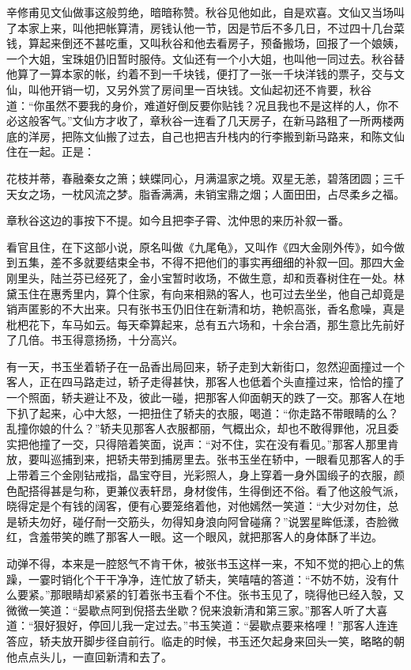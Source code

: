 \documentclass[12pt,UTF8]{ctexbook}
\begin{document}
{{{辛修甫见文仙做事这般剪绝，暗暗称赞。秋谷见他如此，自是欢喜。文仙又当场叫了本家上来，叫他把帐算清，房钱认他一节，因是节后不多几日，不过四十几台菜钱，算起来倒还不甚吃重，又叫秋谷和他去看房子，预备搬场，回报了一个娘姨，一个大姐，宝珠姐仍旧暂时服侍。文仙还有一个小大姐，也叫他一同过去。秋谷替他算了一算本家的帐，约着不到一千块钱，便打了一张一千块洋钱的票子，交与文仙，叫他开销一切，又另外赏了房间里一百块钱。文仙起初还不肯要，秋谷道：“你虽然不要我的身价，难道好倒反要你贴钱？况且我也不是这样的人，你不必这般客气。”文仙方才收了，章秋谷一连看了几天房子，在新马路租了一所两楼两底的洋房，把陈文仙搬了过去，自己也把吉升栈内的行李搬到新马路来，和陈文仙住在一起。正是：

花枝并蒂，春融秦女之箫；蛱蝶同心，月满温家之境。双星无恙，碧落团圆；三千天女之场，一枕风流之梦。脂香满满，未销宝鼎之烟；人面田田，占尽柔乡之福。

章秋谷这边的事按下不提。如今且把李子霄、沈仲思的来历补叙一番。

看官且住，在下这部小说，原名叫做《九尾龟》，又叫作《四大金刚外传》，如今做到五集，差不多就要结束全书，不得不把他们的事实再细细的补叙一回。那四大金刚里头，陆兰芬已经死了，金小宝暂时收场，不做生意，却和贡春树住在一处。林黛玉住在惠秀里内，算个住家，有向来相熟的客人，也可过去坐坐，他自己却竟是销声匿影的不大出来。只有张书玉仍旧住在新清和坊，艳帜高张，香名愈噪，真是枇杷花下，车马如云。每天牵算起来，总有五六场和，十余台酒，那生意比先前好了几倍。书玉得意扬扬，十分高兴。

有一天，书玉坐着轿子在一品香出局回来，轿子走到大新街口，忽然迎面撞过一个客人，正在四马路走过，轿子走得甚快，那客人也低着个头直撞过来，恰恰的撞了一个照面，轿夫避让不及，彼此一碰，把那客人仰面朝天的跌了一交。那客人在地下扒了起来，心中大怒，一把扭住了轿夫的衣服，喝道：“你走路不带眼睛的么？乱撞你娘的什么？”轿夫见那客人衣服都丽，气概出众，却也不敢得罪他，况且委实把他撞了一交，只得陪着笑面，说声：“对不住，实在没有看见。”那客人那里肯放，要叫巡捕到来，把轿夫带到捕房里去。张书玉坐在轿中，一眼看见那客人的手上带着三个金刚钻戒指，晶宝夺目，光彩照人，身上穿着一身外国缎子的衣服，颜色配搭得甚是匀称，更兼仪表轩昂，身材俊伟，生得倒还不俗。看了他这般气派，晓得定是个有钱的阔客，便有心要笼络着他，对他嫣然一笑道：“大少对勿住，总是轿夫勿好，碰仔耐一交筋头，勿得知身浪向阿曾碰痛？”说罢星眸低漾，杏脸微红，含羞带笑的瞧了那客人一眼。这一个眼风，就把那客人的身体酥了半边。

动弹不得，本来是一腔怒气不肯干休，被张书玉这样一来，不知不觉的把心上的焦躁，一霎时销化个干干净净，连忙放了轿夫，笑嘻嘻的答道：“不妨不妨，没有什么要紧。”那眼睛却紧紧的钉着张书玉看个不住。张书玉见了，晓得他已经入彀，又微微一笑道：“晏歇点阿到倪搭去坐歇？倪来浪新清和第三家。”那客人听了大喜道：“狠好狠好，停回儿我一定过去。”书玉笑道：“晏歇点要来格哩！”那客人连连答应，轿夫放开脚步径自前行。临走的时候，书玉还欠起身来回头一笑，略略的朝他点点头儿，一直回新清和去了。

}}}
\end{document}
